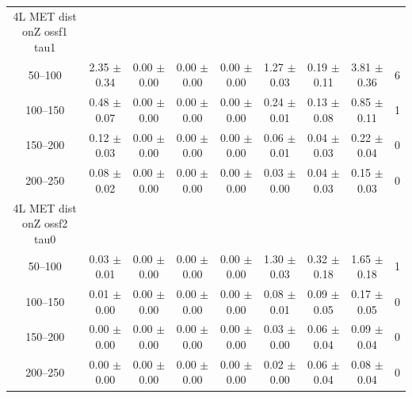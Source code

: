 \begin{table}
\begin{center}
\begin{tabular}{|c|cccccc|c|c|}
4L MET dist onZ ossf1 tau1\\
50--100 & 2.35 $\pm$ 0.34 & 0.00 $\pm$ 0.00 & 0.00 $\pm$ 0.00 & 0.00 $\pm$ 0.00 & 1.27 $\pm$ 0.03 & 0.19 $\pm$ 0.11 & 3.81 $\pm$ 0.36 & 6 \\
100--150 & 0.48 $\pm$ 0.07 & 0.00 $\pm$ 0.00 & 0.00 $\pm$ 0.00 & 0.00 $\pm$ 0.00 & 0.24 $\pm$ 0.01 & 0.13 $\pm$ 0.08 & 0.85 $\pm$ 0.11 & 1 \\
150--200 & 0.12 $\pm$ 0.03 & 0.00 $\pm$ 0.00 & 0.00 $\pm$ 0.00 & 0.00 $\pm$ 0.00 & 0.06 $\pm$ 0.01 & 0.04 $\pm$ 0.03 & 0.22 $\pm$ 0.04 & 0 \\
200--250 & 0.08 $\pm$ 0.02 & 0.00 $\pm$ 0.00 & 0.00 $\pm$ 0.00 & 0.00 $\pm$ 0.00 & 0.03 $\pm$ 0.00 & 0.04 $\pm$ 0.03 & 0.15 $\pm$ 0.03 & 0 \\
\hline
4L MET dist onZ ossf2 tau0\\
50--100 & 0.03 $\pm$ 0.01 & 0.00 $\pm$ 0.00 & 0.00 $\pm$ 0.00 & 0.00 $\pm$ 0.00 & 1.30 $\pm$ 0.03 & 0.32 $\pm$ 0.18 & 1.65 $\pm$ 0.18 & 1 \\
100--150 & 0.01 $\pm$ 0.00 & 0.00 $\pm$ 0.00 & 0.00 $\pm$ 0.00 & 0.00 $\pm$ 0.00 & 0.08 $\pm$ 0.01 & 0.09 $\pm$ 0.05 & 0.17 $\pm$ 0.05 & 0 \\
150--200 & 0.00 $\pm$ 0.00 & 0.00 $\pm$ 0.00 & 0.00 $\pm$ 0.00 & 0.00 $\pm$ 0.00 & 0.03 $\pm$ 0.00 & 0.06 $\pm$ 0.04 & 0.09 $\pm$ 0.04 & 0 \\
200--250 & 0.00 $\pm$ 0.00 & 0.00 $\pm$ 0.00 & 0.00 $\pm$ 0.00 & 0.00 $\pm$ 0.00 & 0.02 $\pm$ 0.00 & 0.06 $\pm$ 0.04 & 0.08 $\pm$ 0.04 & 0 \\
\hline
\hline
\end{tabular}
\end{center}
\end{table}
